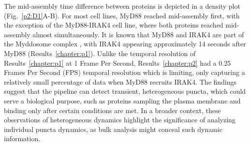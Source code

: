 The mid-assembly time difference between proteins is depicted in a density plot (Fig.~\ref{p2:D1}A-B). For most cell lines, MyD88 reached mid-assembly first, with the exception of the MyD88-IRAK4 cell line, where both proteins reached mid-assembly almost simultaneously. It is known that MyD88 and IRAK4 are part of the Myddosome complex \autocite{Lin_2010}, with IRAK4 appearing approximately 14 seconds after MyD88 (Results~\ref{chapter:p1}). Unlike the temporal resolution of Results~\ref{chapter:p1} at 1 Frame Per Second, Results~\ref{chapter:p2} had a 0.25 Frames Per Second (FPS) temporal resolution which is limiting, only capturing a relatively small percentage of data when MyD88 recruits IRAK4. The findings suggest that the pipeline can detect transient, heterogeneous puncta, which could serve a biological purpose, such as proteins sampling the plasma membrane and binding only after certain conditions are met. In a broader context, these observations of heterogeneous dynamics highlight the significance of analyzing individual puncta dynamics, as bulk analysis might conceal such dynamic information.


